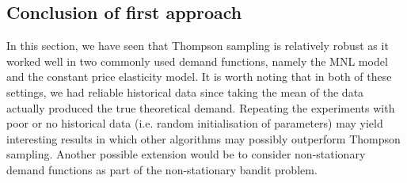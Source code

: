 \documentclass[a4paper]{article}
\begin{document}
\subsection{Conclusion of first approach}
In this section, we have seen that Thompson sampling is relatively robust as it worked well in two commonly used demand functions, namely the MNL model and the constant price elasticity model. It is worth noting that in both of these settings, we had reliable historical data since taking the mean of the data actually produced the true theoretical demand. Repeating the experiments with poor or no historical data (i.e. random initialisation of parameters) may yield interesting results in which other algorithms may possibly outperform Thompson sampling. Another possible extension would be to consider non-stationary demand functions as part of the non-stationary bandit problem.
\end{document}
